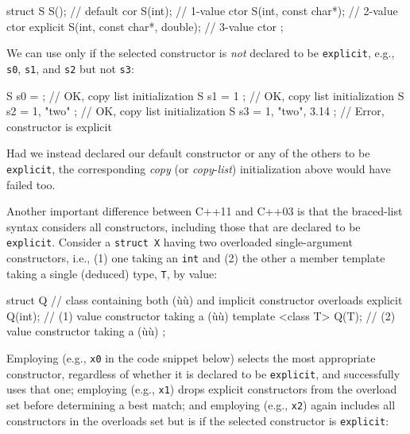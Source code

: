 \begin{emcppslisting}[emcppsbatch=e7]
struct S
{
             S();                          // default cor
             S(int);                       // 1-value ctor
             S(int, const char*);          // 2-value ctor
    explicit S(int, const char*, double);  // 3-value ctor
};
\end{emcppslisting}
    

\noindent We can use  only if the selected
constructor is \emph{not} declared to be \lstinline!explicit!, e.g.,
\lstinline!s0!, \lstinline!s1!, and \lstinline!s2! but not \lstinline!s3!:

\begin{emcppslisting}[emcppsbatch=e7]
S s0 = { };                 // OK, copy list initialization
S s1 = { 1 };               // OK, copy list initialization
S s2 = { 1, "two" };        // OK, copy list initialization
S s3 = { 1, "two", 3.14 };  // Error, constructor is explicit
\end{emcppslisting}
    

\noindent Had we instead declared our default constructor or any of the others to
be \lstinline!explicit!, the corresponding \emph{copy} (or
\emph{copy}-\emph{list}) initialization above would have failed too.

Another important difference between C++11  and C++03  is that the
braced-list syntax considers all constructors, including those that are
declared to be \lstinline!explicit!. Consider a \lstinline!struct!~\lstinline!X!
having two overloaded single-argument constructors, i.e., (1) one taking
an \lstinline!int! and (2) the other a member template taking a single
(deduced) type, \lstinline!T!, by value:

\begin{emcppslisting}[emcppsbatch=e8]
struct Q  // class containing both (ù{}ù) and implicit constructor overloads
{
    explicit Q(int);          // (1) value constructor taking a (ù{}ù)
    template <class T> Q(T);  // (2) value constructor taking a (ù{}ù)
};
\end{emcppslisting}
    

\noindent Employing  (e.g., \lstinline!x0! in
the code snippet below) selects the most appropriate constructor,
regardless of whether it is declared to be \lstinline!explicit!, and
successfully uses that one; employing  (e.g., \lstinline!x1!) drops explicit constructors from the
overload set before determining a best match; and employing  (e.g., \lstinline!x2!) again includes all
constructors in the overloads set but is  if the
selected constructor is \lstinline!explicit!:

